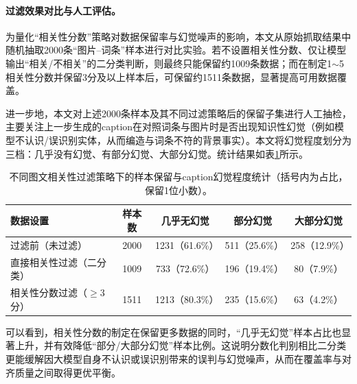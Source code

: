 \paragraph{过滤效果对比与人工评估。}
为量化“相关性分数”策略对数据保留率与幻觉噪声的影响，本文从原始抓取结果中随机抽取2000条“图片--词条”样本进行对比实验。若不设置相关性分数、仅让模型输出“相关/不相关”的二分类判断，则最终只能保留约1009条数据；而在制定1$\sim$5相关性分数并保留3分及以上样本后，可保留约1511条数据，显著提高可用数据覆盖。

进一步地，本文对上述2000条样本及其不同过滤策略后的保留子集进行人工抽检，主要关注上一步生成的caption在对照词条与图片时是否出现知识性幻觉（例如模型不认识/误识别实体，从而编造与词条不符的背景事实）。本文将幻觉程度划分为三档：几乎没有幻觉、有部分幻觉、大部分幻觉。统计结果如表\ref{tab:wk_rel_filter_hallu}所示。

\begin{table}[htbp]
\centering
\caption{不同图文相关性过滤策略下的样本保留与caption幻觉程度统计（括号内为占比，保留1位小数）。}
\label{tab:wk_rel_filter_hallu}
\small
\renewcommand{\arraystretch}{1.2}
\begin{tabular}{lcccc}
\toprule
数据设置 & 样本数 & 几乎无幻觉 & 部分幻觉 & 大部分幻觉 \\
\midrule
过滤前（未过滤） & 2000 & 1231（61.6\%） & 511（25.6\%） & 258（12.9\%） \\
直接相关性过滤（二分类） & 1009 & 733（72.6\%） & 196（19.4\%） & 80（7.9\%） \\
相关性分数过滤（$\ge$3分） & 1511 & 1213（80.3\%） & 235（15.6\%） & 63（4.2\%） \\
\bottomrule
\end{tabular}

\end{table}

可以看到，相关性分数的制定在保留更多数据的同时，“几乎无幻觉”样本占比也显著上升，并有效降低“部分/大部分幻觉”样本比例。这说明分数化判别相比二分类更能缓解因大模型自身不认识或误识别带来的误判与幻觉噪声，从而在覆盖率与对齐质量之间取得更优平衡。

